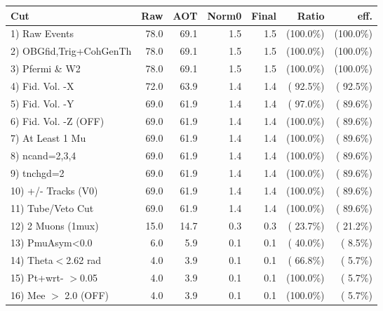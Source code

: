  \begin{table}[h!]\centering
 \begin{tabular}{||l||r|r|r|r|r|r||}
 \hline
 \hline
 Cut & Raw & AOT & Norm0 & Final & Ratio & eff.       \\
 \hline
  1) Raw Events           &         78.0 &         69.1 &          1.5 &          1.5 & (100.0\%) & (100.0\%) \\
  2) OBGfid,Trig+CohGenTh &         78.0 &         69.1 &          1.5 &          1.5 & (100.0\%) & (100.0\%) \\
  3) Pfermi \& W2         &         78.0 &         69.1 &          1.5 &          1.5 & (100.0\%) & (100.0\%) \\
  4) Fid. Vol. -X         &         72.0 &         63.9 &          1.4 &          1.4 & ( 92.5\%) & ( 92.5\%) \\
  5) Fid. Vol. -Y         &         69.0 &         61.9 &          1.4 &          1.4 & ( 97.0\%) & ( 89.6\%) \\
  6) Fid. Vol. -Z (OFF)   &         69.0 &         61.9 &          1.4 &          1.4 & (100.0\%) & ( 89.6\%) \\
  7) At Least 1 Mu        &         69.0 &         61.9 &          1.4 &          1.4 & (100.0\%) & ( 89.6\%) \\
  8) ncand=2,3,4          &         69.0 &         61.9 &          1.4 &          1.4 & (100.0\%) & ( 89.6\%) \\
  9) tnchgd=2             &         69.0 &         61.9 &          1.4 &          1.4 & (100.0\%) & ( 89.6\%) \\
 10) +/- Tracks (V0)      &         69.0 &         61.9 &          1.4 &          1.4 & (100.0\%) & ( 89.6\%) \\
 11) Tube/Veto Cut        &         69.0 &         61.9 &          1.4 &          1.4 & (100.0\%) & ( 89.6\%) \\
 12) 2 Muons (1mux)       &         15.0 &         14.7 &          0.3 &          0.3 & ( 23.7\%) & ( 21.2\%) \\
 13) PmuAsym<0.0          &          6.0 &          5.9 &          0.1 &          0.1 & ( 40.0\%) & (  8.5\%) \\
 14) Theta$<$2.62 rad     &          4.0 &          3.9 &          0.1 &          0.1 & ( 66.8\%) & (  5.7\%) \\
 15) Pt+wrt- $>$0.05      &          4.0 &          3.9 &          0.1 &          0.1 & (100.0\%) & (  5.7\%) \\
 16) Mee $>$ 2.0  (OFF)   &          4.0 &          3.9 &          0.1 &          0.1 & (100.0\%) & (  5.7\%) \\

\end{tabular}
\end{table}
